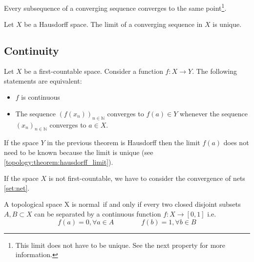 
	\begin{property}
	    	Every subsequence of a converging sequence converges to the same point\footnote{This limit does not have to be unique. See the next property for more information.}.
	\end{property}
	\begin{property}\label{topology:theorem:hausdorff_limit}
	    	Let $X$ be a Hausdorff space. The limit of a converging sequence in $X$ is unique.
	\end{property}

\subsection{Continuity}
    
	\begin{theorem}
    		Let $X$ be a first-countable space. Consider a function $f:X\rightarrow Y$. The following statements are equivalent:
        	\begin{itemize}
        		\item $f$ is continuous
        		\item The sequence $(f(x_n))_{n\in\mathbb{N}}$ converges to $f(a)\in Y$ whenever the sequence $(x_n)_{n\in\mathbb{N}}$ converges to $a\in X$.
	        \end{itemize}
	\end{theorem}
	\begin{result}
	   	If the space $Y$ in the previous theorem is Hausdorff then the limit $f(a)$ does not need to be known because the limit is unique (see \ref{topology:theorem:hausdorff_limit}).
	\end{result}
	\begin{remark}
    		If the space $X$ is not first-countable, we have to consider the convergence of nets \ref{set:net}.
	\end{remark}
    
	\begin{theorem}
    		A topological space X is normal\footnotemark\ if and only if every two closed disjoint subsets $A, B\subset X$ can be separated by a continuous function $f:X\rightarrow [0, 1]$ i.e.
	    	\begin{equation}
    			\label{topology:urysohns_lemma}
    			f(a) = 0, \forall a\in A\qquad\qquad f(b) = 1, \forall b\in B
    		\end{equation}
	\end{theorem}
	
